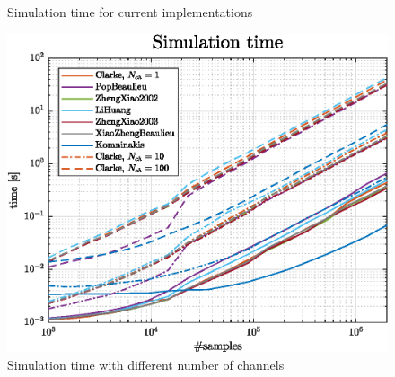 \begin{figure}
	\hfill
	\hfill
	\hfill
	
	\caption{Simulation time for current implementations}
	\label{fig:simTime}
\end{figure}

\begin{figure}
	\centering
	\includegraphics[width=\linewidth]{img/multiSimTime.eps}
	
	\caption{Simulation time with different number of channels}
	\label{fig:multiSimTime}
\end{figure}